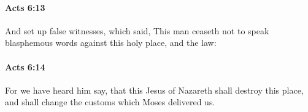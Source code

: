 		\paragraph{Acts 6:13} %
			\label{ACTS-6-13}

			And set up false witnesses, which said, This man ceaseth not to speak blasphemous words against this holy place, and the law:

			\begin{framed}
			\scriptsize
				\begin{compactdesc}
					\item[SBLG] 
				\end{compactdesc}
			\end{framed}

		\paragraph{Acts 6:14} %
			\label{ACTS-6-14}

			For we have heard him say, that this Jesus of Nazareth shall destroy this place, and shall change the customs which Moses delivered us.

